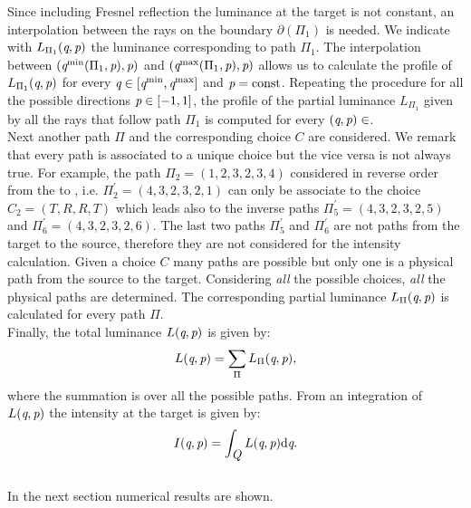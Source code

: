 Since including Fresnel reflection the luminance at the target is not constant, an interpolation between the rays on the boundary $\partial$$(\Pi_1)$ is needed. We indicate with $L_{\Pi_1}(\textit{q},\textit{p})$ the luminance corresponding to path $\Pi_1$. The interpolation between 
$(\textit{q}^{\textrm{min}}(\Pi_1, \textit{p}), \textit{p})$ and $(\textit{q}^{\textrm{max}}(\Pi_1, \textit{p}), \textit{p})$ allows us to calculate the profile of $L_{\Pi_1}(\textit{q},\textit{p})$ for every $\textit{q}\in[\textit{q}^{\textrm{min}}, \textit{q}^{\textrm{max}}]$ and $\textit{p}=\textrm{const}$.
Repeating the procedure for all the possible directions $\textit{p}\in[-1,1]$, the profile of the partial luminance $L_{\Pi_1}$ given by all the rays that follow path $\Pi_1$ is computed for every $(\textit{q}, \textit{p})\in$. 
\\ \indent Next another path $\Pi$ and the corresponding choice $C$ are considered. We remark that every path is associated to a unique choice but the vice versa is not always true. For example, the path $\Pi_2 = (1,2,3,2,3,4)$ considered in reverse order from the  to , i.e. $\Pi_2^{\prime} = (4,3,2,3,2,1)$ can only be associate to the choice $C_2 = (T,R,R,T)$ which leads also to the inverse paths $\Pi_5^{\prime}= (4,3,2,3,2,5)$ and $\Pi_6^{\prime}= (4,3,2,3,2,6)$. The last two paths $\Pi_5^{\prime}$ and $\Pi_6^{\prime}$ are not paths from the target to the source, therefore they are not considered for the intensity calculation. Given a choice $C$ many paths are possible but only one is a physical path from the source to the target. Considering \textit{all} the possible choices, \textit{all} the physical paths are determined. The corresponding partial luminance $L_{\Pi}(\textit{q}, \textit{p})$ is calculated for every path $\Pi$.\\
\indent Finally, the total luminance $L(\textit{q}, \textit{p})$ is given by:
\begin{equation}\label{eq:luminance_fresnel}
L(\textit{q}, \textit{p}) = \sum_{\Pi}L_{\Pi}(\textit{q}, \textit{p}),
\end{equation} 
where the summation is over all the possible paths. 
From an integration of $L(\textit{q}, \textit{p})$ the intensity at the target is given by:
\begin{equation}\label{eq:intensity_fresnel}
I(\textit{q}, \textit{p}) = \int_{\mbox{$\emph{Q}_{\textit{}}$}}L(\textit{q}, \textit{p})\textrm{d}\textit{q}.
\end{equation}
\\ \indent In the next section numerical results are shown.
